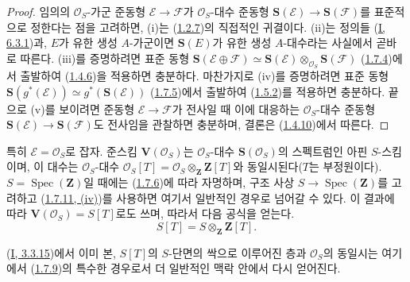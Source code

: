 \begin{proof}
임의의 $\mathcal{O}_S$-가군 준동형 $\mathcal{E}\to\mathcal{F}$가
$\mathcal{O}_S$-대수 준동형
$\mathbf{S}(\mathcal{E})\to\mathbf{S}(\mathcal{F})$를 표준적으로
정한다는 점을 고려하면, (i)는 (\hyperref[II.1.2.7-ko]{1.2.7})의
직접적인 귀결이다. (ii)는 정의들
(\hyperref[I.6.3.1-ko]{I, 6.3.1})과, $E$가 유한 생성 $A$-가군이면
$\mathbf{S}(E)$가 유한 생성 $A$-대수라는 사실에서 곧바로 따른다.
(iii)를 증명하려면 표준 동형
$\mathbf{S}(\mathcal{E}\oplus\mathcal{F})
\simeq\mathbf{S}(\mathcal{E})
\otimes_{\mathcal{O}_S}\mathbf{S}(\mathcal{F})$
(\hyperref[II.1.7.4-ko]{1.7.4})에서 출발하여
(\hyperref[II.1.4.6-ko]{1.4.6})을 적용하면 충분하다. 마찬가지로
(iv)를 증명하려면 표준 동형
$\mathbf{S}(g^*(\mathcal{E}))
\simeq g^*(\mathbf{S}(\mathcal{E}))$
(\hyperref[II.1.7.5-ko]{1.7.5})에서 출발하여
(\hyperref[II.1.5.2-ko]{1.5.2})를 적용하면 충분하다. 끝으로 (v)를
보이려면 준동형 $\mathcal{E}\to\mathcal{F}$가 전사일 때 이에 대응하는
$\mathcal{O}_S$-대수 준동형
$\mathbf{S}(\mathcal{E})\to\mathbf{S}(\mathcal{F})$도 전사임을
관찰하면 충분하며, 결론은 (\hyperref[II.1.4.10-ko]{1.4.10})에서
따른다.
\end{proof}

\begin{env}[1.7.12]
\label{II.1.7.12-ko}
특히 $\mathcal{E}=\mathcal{O}_S$로 잡자. 준스킴
$\mathbf{V}(\mathcal{O}_S)$는 $\mathcal{O}_S$-대수
$\mathbf{S}(\mathcal{O}_S)$의 스펙트럼인 아핀 $S$-스킴이며, 이
대수는 $\mathcal{O}_S$-대수
$\mathcal{O}_S[T]=\mathcal{O}_S\otimes_{\mathbf{Z}}\mathbf{Z}[T]$와
동일시된다($T$는 부정원이다). $S=\operatorname{Spec}(\mathbf{Z})$일
때에는 (\hyperref[II.1.7.6-ko]{1.7.6})에 따라 자명하며, 구조 사상
$S\to\operatorname{Spec}(\mathbf{Z})$를 고려하고
(\hyperref[II.1.7.11-ko]{1.7.11, (iv)})를 사용하면 여기서 일반적인
경우로 넘어갈 수 있다. 이 결과에 따라
$\mathbf{V}(\mathcal{O}_S)=S[T]$로도 쓰며, 따라서 다음 공식을 얻는다.
\[
  S[T]=S\otimes_{\mathbf{Z}}\mathbf{Z}[T].
  \tag{1.7.12.1}\label{II.1.7.12.1-ko}
\]

(\hyperref[I.3.3.15-ko]{I, 3.3.15})에서 이미 본, $S[T]$의
$S$-단면의 싹으로 이루어진 층과 $\mathcal{O}_S$의 동일시는 여기에서
(\hyperref[II.1.7.9-ko]{1.7.9})의 특수한 경우로서 더 일반적인 맥락
안에서 다시 얻어진다.
\end{env}

